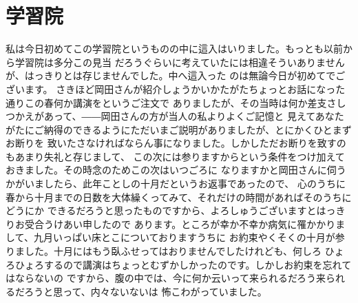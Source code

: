 \section{学習院}
私は今日初めてこの学習院というものの中に這入はいりました。もっとも以前から学習院は多分この見当
だろうぐらいに考えていたには相違そういありませんが、はっきりとは存じませんでした。中へ這入った
のは無論今日が初めてでございます。
さきほど岡田さんが紹介しょうかいかたがたちょっとお話になった通りこの春何か講演をというご注文で
ありましたが、その当時は何か差支さしつかえがあって、――岡田さんの方が当人の私よりよくご記憶と
見えてあなたがたにご納得のできるようにただいまご説明がありましたが、とにかくひとまずお断りを
致いたさなければならん事になりました。しかしただお断りを致すのもあまり失礼と存じまして、
この次には参りますからという条件をつけ加えておきました。その時念のためこの次はいつごろに
なりますかと岡田さんに伺うかがいましたら、此年ことしの十月だというお返事であったので、
心のうちに春から十月までの日数を大体繰くってみて、それだけの時間があればそのうちにどうにか
できるだろうと思ったものですから、よろしゅうございますとはっきりお受合うけあい申したので
あります。ところが幸か不幸か病気に罹かかりまして、九月いっぱい床とこについておりますうちに
お約束やくそくの十月が参りました。十月にはもう臥ふせってはおりませんでしたけれども、何しろ
ひょろひょろするので講演はちょっとむずかしかったのです。しかしお約束を忘れてはならないの
ですから、腹の中では、今に何か云いって来られるだろう来られるだろうと思って、内々ないないは
怖こわがっていました。

